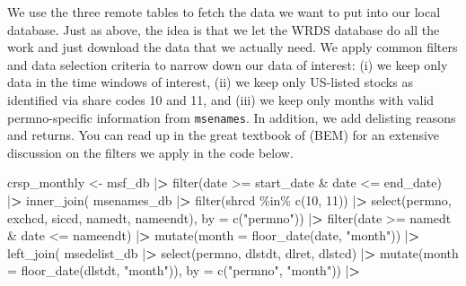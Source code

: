 \documentclass[
]{book}
\newenvironment{Shaded}{\begin{snugshade}}{\end{snugshade}}
\newcommand{\AttributeTok}[1]{\textcolor[rgb]{0.61,0.61,0.61}{#1}}
\newcommand{\DecValTok}[1]{\textcolor[rgb]{0.06,0.06,0.06}{#1}}
\newcommand{\ErrorTok}[1]{\textcolor[rgb]{0.14,0.14,0.14}{\textbf{#1}}}
\newcommand{\FunctionTok}[1]{\textcolor[rgb]{0,0,0}{#1}}
\newcommand{\NormalTok}[1]{#1}
\newcommand{\OtherTok}[1]{\textcolor[rgb]{0.37,0.37,0.37}{#1}}
\newcommand{\SpecialCharTok}[1]{\textcolor[rgb]{0,0,0}{#1}}
\newcommand{\StringTok}[1]{\textcolor[rgb]{0.5,0.5,0.5}{#1}}
\begin{document}
We use the three remote tables to fetch the data we want to put into our local database. Just as above, the idea is that we let the WRDS database do all the work and just download the data that we actually need. We apply common filters and data selection criteria to narrow down our data of interest: (i) we keep only data in the time windows of interest, (ii) we keep only US-listed stocks as identified via share codes 10 and 11, and (iii) we keep only months with valid permno-specific information from \texttt{msenames}. In addition, we add delisting reasons and returns. You can read up in the great textbook of \citet{BaliEngleMurray2016} (BEM) for an extensive discussion on the filters we apply in the code below.

\begin{Shaded}
\begin{Highlighting}[]
\NormalTok{crsp\_monthly }\OtherTok{\textless{}{-}}\NormalTok{ msf\_db }\SpecialCharTok{|}\ErrorTok{\textgreater{}}
  \FunctionTok{filter}\NormalTok{(date }\SpecialCharTok{\textgreater{}=}\NormalTok{ start\_date }\SpecialCharTok{\&}\NormalTok{ date }\SpecialCharTok{\textless{}=}\NormalTok{ end\_date) }\SpecialCharTok{|}\ErrorTok{\textgreater{}}
  \FunctionTok{inner\_join}\NormalTok{(}
\NormalTok{    msenames\_db }\SpecialCharTok{|}\ErrorTok{\textgreater{}}
      \FunctionTok{filter}\NormalTok{(shrcd }\SpecialCharTok{\%in\%} \FunctionTok{c}\NormalTok{(}\DecValTok{10}\NormalTok{, }\DecValTok{11}\NormalTok{)) }\SpecialCharTok{|}\ErrorTok{\textgreater{}}
      \FunctionTok{select}\NormalTok{(permno, exchcd, siccd, namedt, nameendt), }
    \AttributeTok{by =} \FunctionTok{c}\NormalTok{(}\StringTok{"permno"}\NormalTok{)) }\SpecialCharTok{|}\ErrorTok{\textgreater{}}
  \FunctionTok{filter}\NormalTok{(date }\SpecialCharTok{\textgreater{}=}\NormalTok{ namedt }\SpecialCharTok{\&}\NormalTok{ date }\SpecialCharTok{\textless{}=}\NormalTok{ nameendt) }\SpecialCharTok{|}\ErrorTok{\textgreater{}}
  \FunctionTok{mutate}\NormalTok{(}\AttributeTok{month =} \FunctionTok{floor\_date}\NormalTok{(date, }\StringTok{"month"}\NormalTok{)) }\SpecialCharTok{|}\ErrorTok{\textgreater{}}
  \FunctionTok{left\_join}\NormalTok{(}
\NormalTok{    msedelist\_db }\SpecialCharTok{|}\ErrorTok{\textgreater{}}
      \FunctionTok{select}\NormalTok{(permno, dlstdt, dlret, dlstcd) }\SpecialCharTok{|}\ErrorTok{\textgreater{}}
      \FunctionTok{mutate}\NormalTok{(}\AttributeTok{month =} \FunctionTok{floor\_date}\NormalTok{(dlstdt, }\StringTok{"month"}\NormalTok{)), }
    \AttributeTok{by =} \FunctionTok{c}\NormalTok{(}\StringTok{"permno"}\NormalTok{, }\StringTok{"month"}\NormalTok{)) }\SpecialCharTok{|}\ErrorTok{\textgreater{}}

\end{Highlighting}
\end{Shaded}
\end{document}
